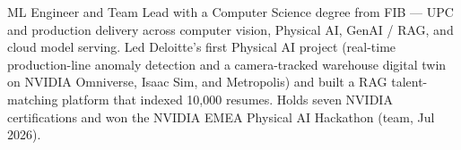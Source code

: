 


\begin{cvparagraph}
    ML Engineer and Team Lead with a Computer Science degree from FIB --- UPC and production delivery across computer vision, Physical AI, GenAI / RAG, and cloud model serving. Led Deloitte's first Physical AI project (real-time production-line anomaly detection and a camera-tracked warehouse digital twin on NVIDIA Omniverse, Isaac Sim, and Metropolis) and built a RAG talent-matching platform that indexed 10,000 resumes. Holds seven NVIDIA certifications and won the NVIDIA EMEA Physical AI Hackathon (team, Jul 2026).
\end{cvparagraph}
